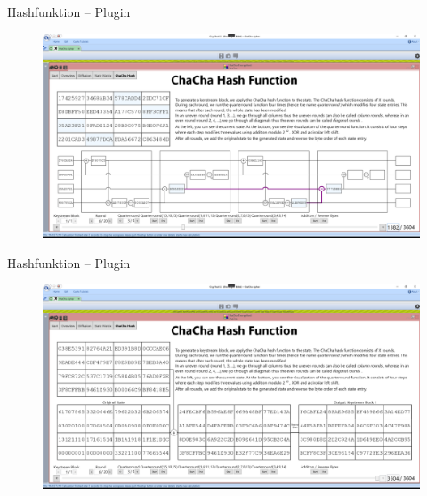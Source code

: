 \documentclass{beamer}
\begin{document}
\begin{frame}{Hashfunktion -- Plugin}
\begin{figure}
\center
\begin{minipage}{\textwidth}
\includegraphics[width=\textwidth]{figures/chachahash/chachahash-mid-qr.png}
\end{minipage}
\end{figure}
\end{frame}

\begin{frame}{Hashfunktion -- Plugin}
\begin{figure}
\center
\begin{minipage}{\textwidth}
\includegraphics[width=\textwidth]{figures/chachahash/chachahash-end.png}
\end{minipage}
\end{figure}
\end{frame}
\end{document}
